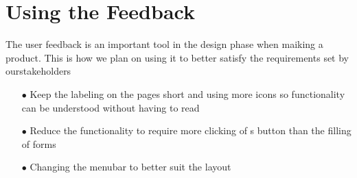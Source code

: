 \documentclass[11pt]{article}
\begin{document}
\section{Using the Feedback}
	The user feedback is an important tool in the design phase when maiking a product. This is how we plan on using it to better satisfy the requirements set by ourstakeholders
	\begin{itemize}
		\item[$\bullet$] Keep the labeling on the pages short and using more icons so functionality can be understood without having to read	
		\item[$\bullet$] Reduce the functionality to require more clicking of s button than the filling of forms
		\item[$\bullet$] Changing the menubar to better suit the layout
	\end{itemize}
\end{document}
